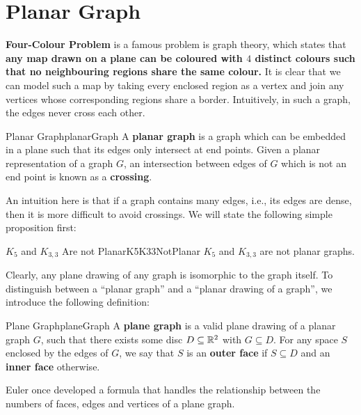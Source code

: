 \documentclass[math]{amznotes}
\theoremstyle{remark}
\newcommand{\0}{\mathbf{0}}
\newcommand{\1}{\mathbf{1}}
\begin{document}
\section{Planar Graph}
\textbf{Four-Colour Problem} is a famous problem is graph theory, which states that \textbf{any map drawn on a plane can be coloured with $4$ distinct colours such that no neighbouring regions share the same colour.} It is clear that we can model such a map by taking every enclosed region as a vertex and join any vertices whose corresponding regions share a border. Intuitively, in such a graph, the edges never cross each other.
\begin{dfnbox}{Planar Graph}{planarGraph}
    A {\color{red} \textbf{planar graph}} is a graph which can be embedded in a plane such that its edges only intersect at end points. Given a planar representation of a graph $G$, an intersection between edges of $G$ which is not an end point is known as a {\color{red} \textbf{crossing}}.
\end{dfnbox}
An intuition here is that if a graph contains many edges, i.e., its edges are dense, then it is more difficult to avoid crossings. We will state the following simple proposition first:
\begin{probox}{$K_5$ and $K_{3, 3}$ Are not Planar}{K5K33NotPlanar}
    $K_5$ and $K_{3, 3}$ are not planar graphs.
\end{probox}
Clearly, any plane drawing of any graph is isomorphic to the graph itself. To distinguish between a ``planar graph'' and a ``planar drawing of a graph'', we introduce the following definition:
\begin{dfnbox}{Plane Graph}{planeGraph}
    A {\color{red} \textbf{plane graph}} is a valid plane drawing of a planar graph $G$, such that there exists some disc $D \subseteq \mathbb{R}^2$ with $G \subseteq D$. For any space $S$ enclosed by the edges of $G$, we say that $S$ is an {\color{red} \textbf{outer face}} if $S \subseteq D$ and an {\color{red} \textbf{inner face}} otherwise.
\end{dfnbox}
Euler once developed a formula that handles the relationship between the numbers of faces, edges and vertices of a plane graph.
\end{document}
